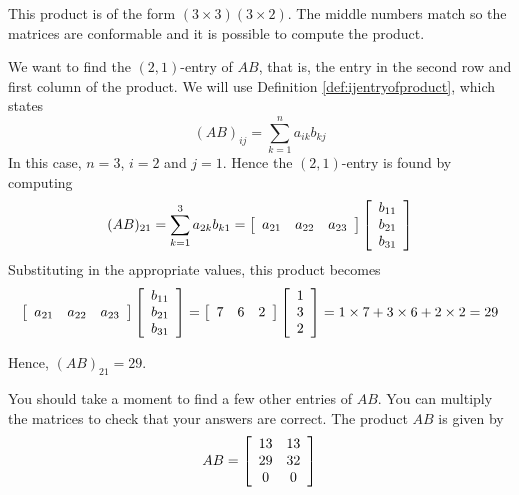 \begin{solution} This product is of the form $\left( 3\times
3\right) \left( 3\times 2\right) $. The middle numbers match so the
matrices are conformable and it is possible to compute the product.  

We want to find the $\left( 2, 1 \right)$-entry of $AB$, that is, the entry in the second row and first column of the product.
We will use Definition \ref{def:ijentryofproduct}, which states 
\begin{equation*}
(AB)_{ij}=\sum_{k=1}^{n}a_{ik}b_{kj}
\end{equation*}
In this case, $n=3$, $i=2$ and $j=1$. Hence the $\left( 2, 1 \right)$-entry is found by computing
\begin{equation*}
 (AB)_{21} = \sum_{k=1}^{3}a_{2k}b_{k1} = 
 \left[
\begin{array}{ccc}
a_{21} & a_{22} & a_{23}
\end{array}
\right] \left[
\begin{array}{c}
b_{11} \\
b_{21} \\
b_{31}
\end{array}
\right]  
\end{equation*}
Substituting in the appropriate values, this product becomes
\begin{equation*}
\left[
\begin{array}{ccc}
a_{21} & a_{22} & a_{23}
\end{array}
\right] \left[
\begin{array}{c}
b_{11} \\
b_{21} \\
b_{31}
\end{array}
\right] 
=
\left[
\begin{array}{ccc}
7 & 6 & 2
\end{array}
\right] \left[
\begin{array}{c}
1 \\
3 \\
2
\end{array}
\right]
=
1 \times 7 + 3 \times 6 + 2 \times 2
=
29
\end{equation*}

Hence,  $(AB)_{21} = 29$.

You should take a moment to find a few other entries of $AB$. You can multiply the matrices to check that your answers are correct.
The product $AB$ is given by 
\begin{equation*}
AB = \left[
\begin{array}{cc}
13 & 13 \\
29 & 32 \\
0 & 0
\end{array}
\right] 
\end{equation*}
\end{solution}